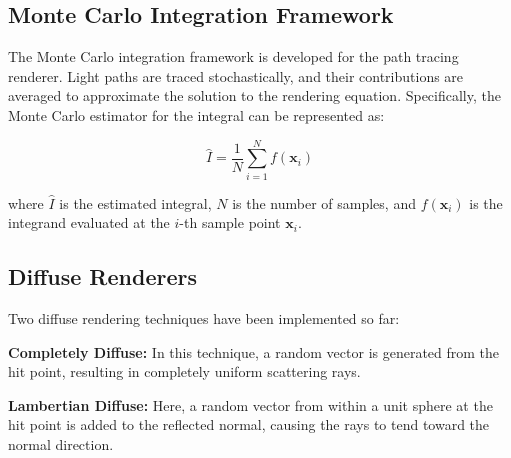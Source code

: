 \documentclass[12pt]{article}
\begin{document}
\subsection{Monte Carlo Integration Framework}
The Monte Carlo integration framework is developed for the path tracing renderer. Light paths are traced stochastically, and their contributions are averaged to approximate the solution to the rendering equation. Specifically, the Monte Carlo estimator for the integral can be represented as:

\begin{equation}
    \hat{I} = \frac{1}{N} \sum_{i=1}^{N} f(\mathbf{x}_i)
\end{equation}

where $\hat{I}$ is the estimated integral, $N$ is the number of samples, and $f(\mathbf{x}_i)$ is the integrand evaluated at the $i$-th sample point $\mathbf{x}_i$.

\subsection{Diffuse Renderers}
Two diffuse rendering techniques have been implemented so far:

\textbf{Completely Diffuse:} In this technique, a random vector is generated from the hit point, resulting in completely uniform scattering rays.

\textbf{Lambertian Diffuse:} Here, a random vector from within a unit sphere at the hit point is added to the reflected normal, causing the rays to tend toward the normal direction.
\end{document}
